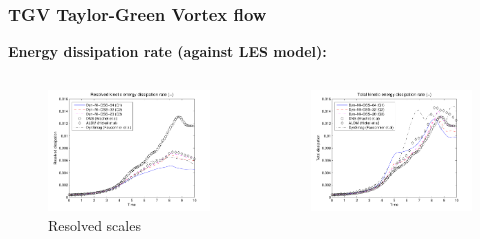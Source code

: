 \begin{frame}
 \frametitle{TGV {\small Taylor-Green Vortex flow}}
 \textbf{Energy dissipation rate (against LES model):}
 \vspace*{-1.0cm}
 \begin{columns}
   \begin{column}{0.5\textwidth}
   \begin{figure}
     \centering	
     \includegraphics[width=1.1\textwidth]{Figures/ens_64dofs_dynsmag_resolved.pdf}
     \vspace*{-0.8cm}
     \caption{Resolved scales}
   \end{figure}
   \end{column}
   \begin{column}{0.5\textwidth}
   \begin{figure}
     \centering	
     \includegraphics[width=1.1\textwidth]{Figures/ens_64dofs_dynsmag_total.pdf}

\end{figure}
\end{column}
\end{columns}
\end{frame}
